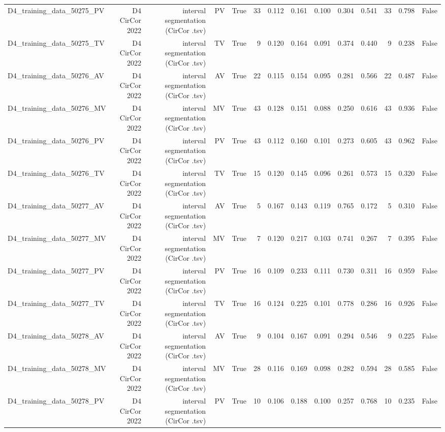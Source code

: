 \begin{table}[htbp]
\begin{tabular}{lrrrrrrrrrrrrr}
    D4\_training\_data\_50275\_PV & D4 CirCor 2022 & interval segmentation (CirCor .tsv) & PV & True & 33 & 0.112 & 0.161 & 0.100 & 0.304 & 0.541 & 33 & 0.798 & False \\
    D4\_training\_data\_50275\_TV & D4 CirCor 2022 & interval segmentation (CirCor .tsv) & TV & True & 9 & 0.120 & 0.164 & 0.091 & 0.374 & 0.440 & 9 & 0.238 & False \\
    D4\_training\_data\_50276\_AV & D4 CirCor 2022 & interval segmentation (CirCor .tsv) & AV & True & 22 & 0.115 & 0.154 & 0.095 & 0.281 & 0.566 & 22 & 0.487 & False \\
    D4\_training\_data\_50276\_MV & D4 CirCor 2022 & interval segmentation (CirCor .tsv) & MV & True & 43 & 0.128 & 0.151 & 0.088 & 0.250 & 0.616 & 43 & 0.936 & False \\
    D4\_training\_data\_50276\_PV & D4 CirCor 2022 & interval segmentation (CirCor .tsv) & PV & True & 43 & 0.112 & 0.160 & 0.101 & 0.273 & 0.605 & 43 & 0.962 & False \\
    D4\_training\_data\_50276\_TV & D4 CirCor 2022 & interval segmentation (CirCor .tsv) & TV & True & 15 & 0.120 & 0.145 & 0.096 & 0.261 & 0.573 & 15 & 0.320 & False \\
    D4\_training\_data\_50277\_AV & D4 CirCor 2022 & interval segmentation (CirCor .tsv) & AV & True & 5 & 0.167 & 0.143 & 0.119 & 0.765 & 0.172 & 5 & 0.310 & False \\
    D4\_training\_data\_50277\_MV & D4 CirCor 2022 & interval segmentation (CirCor .tsv) & MV & True & 7 & 0.120 & 0.217 & 0.103 & 0.741 & 0.267 & 7 & 0.395 & False \\
    D4\_training\_data\_50277\_PV & D4 CirCor 2022 & interval segmentation (CirCor .tsv) & PV & True & 16 & 0.109 & 0.233 & 0.111 & 0.730 & 0.311 & 16 & 0.959 & False \\
    D4\_training\_data\_50277\_TV & D4 CirCor 2022 & interval segmentation (CirCor .tsv) & TV & True & 16 & 0.124 & 0.225 & 0.101 & 0.778 & 0.286 & 16 & 0.926 & False \\
    D4\_training\_data\_50278\_AV & D4 CirCor 2022 & interval segmentation (CirCor .tsv) & AV & True & 9 & 0.104 & 0.167 & 0.091 & 0.294 & 0.546 & 9 & 0.225 & False \\
    D4\_training\_data\_50278\_MV & D4 CirCor 2022 & interval segmentation (CirCor .tsv) & MV & True & 28 & 0.116 & 0.169 & 0.098 & 0.282 & 0.594 & 28 & 0.585 & False \\
    D4\_training\_data\_50278\_PV & D4 CirCor 2022 & interval segmentation (CirCor .tsv) & PV & True & 10 & 0.106 & 0.188 & 0.100 & 0.257 & 0.768 & 10 & 0.235 & False \\

\end{tabular}
\end{table}
